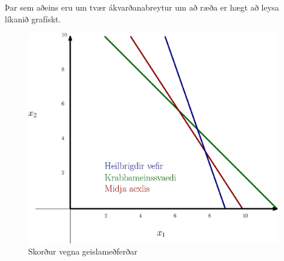 \begin{aths}
Þar sem aðeins eru um tvær ákvarðanabreytur um að ræða er hægt að leysa líkanið grafískt. 
\end{aths}

\begin{figure}[h!]
\begin{center}
  \includegraphics[width=0.8\columnwidth]{figs/cancer.eps}
\end{center}\caption{Skorður vegna geislameðferðar}  
\end{figure}

